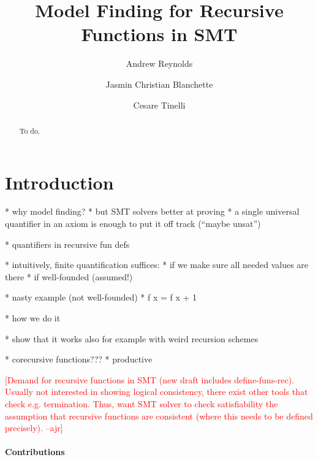 \documentclass[runningheads,a4paper]{llncs}
\newcommand{\rem}[1]{\textcolor{red}{[#1]}}
\newcommand{\ajr}[1]{\rem{#1 --ajr}}
\begin{document}
\title{Model Finding for Recursive Functions in SMT}

\author {Andrew Reynolds \and Jasmin Christian Blanchette \and Cesare Tinelli }

\maketitle

\begin{abstract}
To do.
\end{abstract}

\section{Introduction}
\label{sec:introduction}

  * why model finding?
  * but SMT solvers better at proving
    * a single universal quantifier in an axiom is enough to put it off track
      (``maybe unsat'')

  * quantifiers in recursive fun defs

  * intuitively, finite quantification suffices:
    * if we make sure all needed values are there
    * if well-founded (assumed!)

  * nasty example (not well-founded)
    * f x = f x + 1

  * how we do it

  * show that it works also for example with weird recursion schemes

  * corecursive functions???
    * productive


\ajr{Demand for recursive functions in SMT (new draft includes define-funs-rec).  Usually not interested in showing logical consistency, there exist other tools that check e.g. termination. 
Thus, want SMT solver to check satisfiability the assumption that recursive functions are consistent (where this needs to be defined precisely).
}

\paragraph{Contributions}
\end{document}
